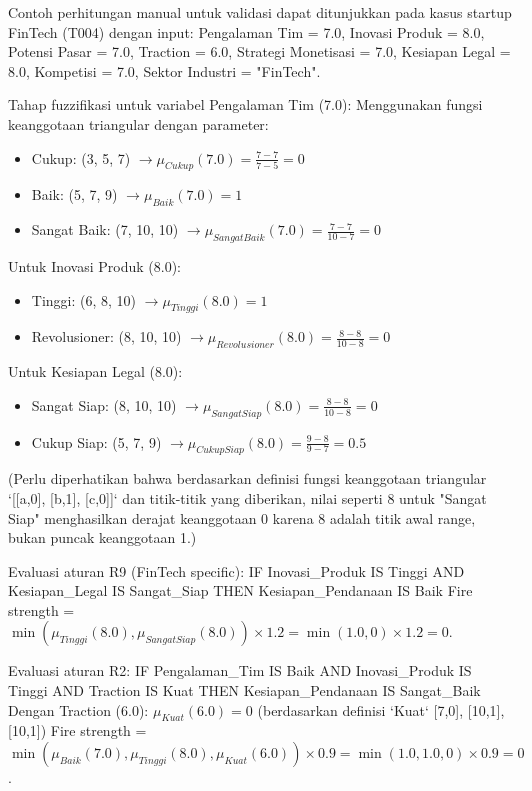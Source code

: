 \documentclass[12pt,a4paper]{article}
\begin{document}
Contoh perhitungan manual untuk validasi dapat ditunjukkan pada kasus startup FinTech (T004) dengan input: Pengalaman Tim = 7.0, Inovasi Produk = 8.0, Potensi Pasar = 7.0, Traction = 6.0, Strategi Monetisasi = 7.0, Kesiapan Legal = 8.0, Kompetisi = 7.0, Sektor Industri = "FinTech".

Tahap fuzzifikasi untuk variabel Pengalaman Tim (7.0):
Menggunakan fungsi keanggotaan triangular dengan parameter:
\begin{itemize}
    \item Cukup: (3, 5, 7) $\rightarrow \mu_{Cukup}(7.0) = \frac{7-7}{7-5} = 0$
    \item Baik: (5, 7, 9) $\rightarrow \mu_{Baik}(7.0) = 1$
    \item Sangat Baik: (7, 10, 10) $\rightarrow \mu_{SangatBaik}(7.0) = \frac{7-7}{10-7} = 0$
\end{itemize}
Untuk Inovasi Produk (8.0):
\begin{itemize}
    \item Tinggi: (6, 8, 10) $\rightarrow \mu_{Tinggi}(8.0) = 1$
    \item Revolusioner: (8, 10, 10) $\rightarrow \mu_{Revolusioner}(8.0) = \frac{8-8}{10-8} = 0$
\end{itemize}
Untuk Kesiapan Legal (8.0):
\begin{itemize}
    \item Sangat Siap: (8, 10, 10) $\rightarrow \mu_{SangatSiap}(8.0) = \frac{8-8}{10-8} = 0$
    \item Cukup Siap: (5, 7, 9) $\rightarrow \mu_{CukupSiap}(8.0) = \frac{9-8}{9-7} = 0.5$
\end{itemize}
(Perlu diperhatikan bahwa berdasarkan definisi fungsi keanggotaan triangular `[[a,0], [b,1], [c,0]]` dan titik-titik yang diberikan, nilai seperti 8 untuk "Sangat Siap" menghasilkan derajat keanggotaan 0 karena 8 adalah titik awal range, bukan puncak keanggotaan 1.)

Evaluasi aturan R9 (FinTech specific): IF Inovasi\_Produk IS Tinggi AND Kesiapan\_Legal IS Sangat\_Siap THEN Kesiapan\_Pendanaan IS Baik
Fire strength = $\min(\mu_{Tinggi}(8.0), \mu_{SangatSiap}(8.0)) \times 1.2 = \min(1.0, 0) \times 1.2 = 0$.

Evaluasi aturan R2: IF Pengalaman\_Tim IS Baik AND Inovasi\_Produk IS Tinggi AND Traction IS Kuat THEN Kesiapan\_Pendanaan IS Sangat\_Baik
Dengan Traction (6.0): $\mu_{Kuat}(6.0) = 0$ (berdasarkan definisi `Kuat` [7,0], [10,1], [10,1])
Fire strength = $\min(\mu_{Baik}(7.0), \mu_{Tinggi}(8.0), \mu_{Kuat}(6.0)) \times 0.9 = \min(1.0, 1.0, 0) \times 0.9 = 0$.
\end{document}
